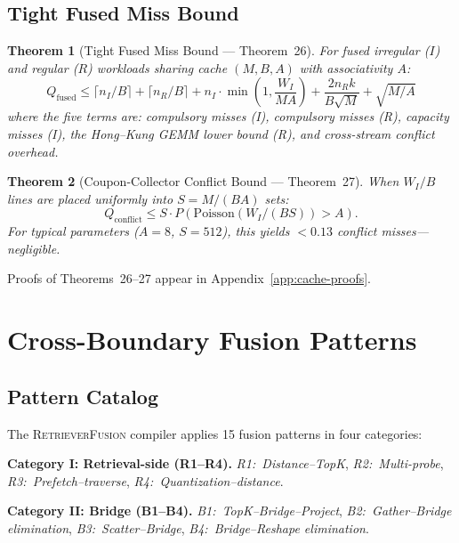\documentclass{article}
\newtheorem{theorem}{Theorem}
\theoremstyle{definition}
\theoremstyle{remark}
\newcommand{\ceil}[1]{\lceil #1 \rceil}
\newcommand{\Qfused}{Q_{\mathrm{fused}}}
\newcommand{\RetrieverFusion}{\textsc{RetrieverFusion}}
\begin{document}
\subsection{Tight Fused Miss Bound}

\begin{theorem}[Tight Fused Miss Bound --- Theorem~26]\label{thm:tight-fused}
For fused irregular ($I$) and regular ($R$) workloads sharing cache $(M, B, A)$ with associativity $A$:
\[
  \Qfused \leq \ceil{n_I/B} + \ceil{n_R/B} + n_I \cdot \min\!\left(1, \frac{W_I}{MA}\right) + \frac{2 n_R k}{B\sqrt{M}} + \sqrt{M/A}
\]
where the five terms are: compulsory misses (I), compulsory misses (R), capacity misses (I), the Hong--Kung GEMM lower bound (R), and cross-stream conflict overhead.
\end{theorem}

\begin{theorem}[Coupon-Collector Conflict Bound --- Theorem~27]\label{thm:coupon}
When $W_I/B$ lines are placed uniformly into $S = M/(BA)$ sets:
\[
  Q_{\mathrm{conflict}} \leq S \cdot P(\mathrm{Poisson}(W_I/(BS)) > A).
\]
For typical parameters ($A{=}8$, $S{=}512$), this yields $< 0.13$ conflict misses---negligible.
\end{theorem}

Proofs of Theorems~26--27 appear in Appendix~\ref{app:cache-proofs}.

\section{Cross-Boundary Fusion Patterns}\label{sec:patterns}

\subsection{Pattern Catalog}

The \RetrieverFusion{} compiler applies 15 fusion patterns in four categories:

\smallskip\noindent\textbf{Category I: Retrieval-side (R1--R4).}
\emph{R1:~Distance--TopK}, \emph{R2:~Multi-probe}, \emph{R3:~Prefetch--traverse}, \emph{R4:~Quantization--distance}.

\smallskip\noindent\textbf{Category II: Bridge (B1--B4).}
\emph{B1:~TopK--Bridge--Project}, \emph{B2:~Gather--Bridge elimination}, \emph{B3:~Scatter--Bridge}, \emph{B4:~Bridge--Reshape elimination}.
\end{document}
